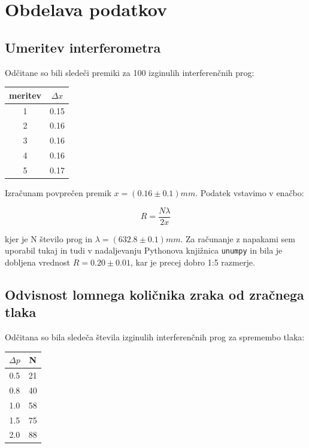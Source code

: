 \documentclass[12pt]{report}
\begin{document}
\endgroup


\chapter*{Obdelava podatkov}

\section*{Umeritev interferometra}

Odčitane so bili sledeči premiki za 100 izginulih interferenčnih prog: 

\begin{tabela}
  \centering
  \begin{tabular}{|c|c|} \hline
      meritev & $\Delta x$ \\ \hline
      1 & 0.15 \\ \hline
      2 & 0.16 \\ \hline
      3 & 0.16 \\ \hline
      4 & 0.16 \\ \hline
      5 & 0.17 \\ \hline
  \end{tabular}
\end{tabela}

Izračunam povprečen premik $x = (0.16\pm0.1)mm$. Podatek vstavimo v enačbo: 

\begin{equation}
  R = \frac{N \lambda}{2 x}
\end{equation}

kjer je N število prog in $\lambda = (632.8\pm0.1)mm$. Za računanje z napakami sem uporabil tukaj in tudi v nadaljevanju Pythonova knjižnica \verb+unumpy+ in bila je dobljena vrednost $R = 0.20 \pm 0.01$, kar je precej dobro 1:5 razmerje. 

\section*{Odvisnost lomnega količnika zraka od zračnega tlaka}

Odčitana so bila sledeča števila izginulih interferenčnih prog za spremembo tlaka: 

\begin{tabela}
  \centering
  \begin{tabular}{|c|c|}\hline
    $\Delta p$ & N \\ \hline
    0.5 & 21 \\ \hline
    0.8 & 40 \\ \hline
    1.0 & 58 \\ \hline
    1.5 & 75 \\ \hline
    2.0 & 88 \\ \hline
  \end{tabular}
\end{tabela}
\end{document}
